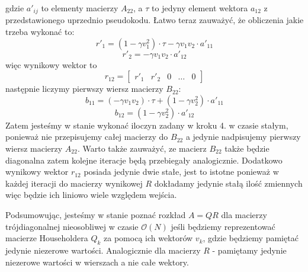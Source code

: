 \documentclass[a4paper]{article}
\begin{document}
gdzie $a'_{ij}$ to elementy macierzy $A_{22}$, a $\tau$ to jedyny element wektora $a_{12}$ z przedstawionego uprzednio pseudokodu. Łatwo teraz zauważyć, że obliczenia jakie trzeba wykonać to:
$$
r'_1 = (1 - \gamma v_1^2)\cdot \tau -\gamma v_1v_2 \cdot a'_{11}
$$
$$
r'_2 = -\gamma v_1v_2 \cdot a'_{12}
$$
więc wynikowy wektor to
$$
r_{12} = \begin{bmatrix}
r'_1 & r'_2 & 0 & \dots & 0
\end{bmatrix}
$$
następnie liczymy pierwszy wiersz macierzy $B_{22}$:
$$
b_{11} = (-\gamma v_1v_2) \cdot \tau + (1 - \gamma v_2^2) \cdot a'_{11}
$$
$$
b_{12} = (1 - \gamma v_2^2) \cdot a'_{12}
$$
Zatem jesteśmy w stanie wykonać iloczyn zadany w kroku 4. w czasie stałym, ponieważ nie przepisujemy całej macierzy do $B_{22}$ a jedynie nadpisujemy pierwszy wiersz macierzy $A_{22}$. Warto także zauważyć, ze macierz $B_{22}$ także będzie diagonalna zatem kolejne iteracje będą przebiegały analogicznie. Dodatkowo wynikowy wektor $r_{12}$ posiada jedynie dwie stałe, jest to istotne ponieważ w każdej iteracji do macierzy wynikowej $R$ dokładamy jedynie stałą ilość zmiennych więc będzie ich liniowo wiele względem wejścia.

Podsumowując, jesteśmy w stanie poznać rozkład $A=QR$ dla macierzy trójdiagonalnej nieosobliwej w czasie $\mathcal{O}(N)$ jeśli będziemy reprezentować macierze Householdera $Q_k$ za pomocą ich wektorów $v_k$, gdzie będziemy pamiętać jedynie niezerowe wartości. Analogicznie dla macierzy $R$ - pamiętamy jedynie niezerowe wartości w wierszach a nie całe wektory.
\end{document}

